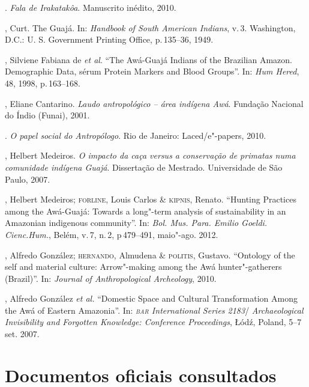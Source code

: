 \begin{bibliohedra}
\titidem. \emph{Fala de Irakatakôa}. Manuscrito inédito, 2010.

, Curt. The Guajá. In: \emph{Handbook of South American
Indians}, v.\,3. Washington, D.C.: U. S. Government Printing Office, p.\,135--36, 1949.

, Silviene Fabiana de \emph{et al}.  ``The Awá-Guajá Indians of
the Brazilian Amazon. Demographic Data, sérum Protein Markers and Blood
Groups''. In: \emph{Hum Hered}, 48, 1998, p.\,163--168.

, Eliane Cantarino. \emph{Laudo antropológico -- área
indígena Awá}. Fundação Nacional do Índio (Funai), 2001.

\titidem. \emph{O papel social do Antropólogo}.
Rio de Janeiro: Laced/e"-papers, 2010.

, Helbert Medeiros. \emph{O impacto da caça versus a conservação de
primatas numa comunidade indígena Guajá}. Dissertação de Mestrado.
Universidade de São Paulo, 2007.

, Helbert Medeiros; \textsc{forline}, Louis Carlos \& \textsc{kipnis}, Renato.
``Hunting Practices among the Awá-Guajá: Towards a long"-term analysis of
sustainability in an Amazonian indigenous community''. In: \emph{Bol. Mus.
Para. Emilio Goeldi. Cienc.Hum.}, Belém, v.\,7, n.\,2, p\,479--491, maio"-ago. 2012.

, Alfredo González; \textsc{hernando}, Almudena \& \textsc{politis}, Gustavo.
``Ontology of the self and material culture: Arrow"-making among the Awá
hunter"-gatherers (Brazil)''. In: \emph{Journal of Anthropological
Archeology}, 2010.

, Alfredo González \emph{et al.} ``Domestic Space and Cultural Transformation
Among the Awá of Eastern Amazonia''. In: \emph{\textsc{bar} International Series
2183}/ \emph{Archaeological Invisibility and Forgotten Knowledge:
Conference Proceedings}, Łódź, Poland, 5--7 set. 2007.
\end{bibliohedra}


\section{Documentos oficiais consultados}

